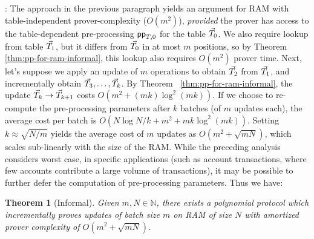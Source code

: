 \documentclass[11pt]{article}
\newtheorem{theorem}{Theorem}[section]
\begin{document}
    : The approach in the previous paragraph yields an argument for RAM with
    table-independent prover-complexity ($O(m^2)$), {\em provided} the prover has access to the table-dependent pre-processing
    $\mathsf{pp}_{T,0}$ for the table $\vec{T}_0$. We also require lookup from table $\vec{T}_1$, but it differs from $\vec{T}_0$ in at most $m$
    positions, so by Theorem \ref{thm:pp-for-ram-informal}, this lookup also requires $O(m^2)$ prover time. Next, let's suppose we apply an
    update of $m$ operations to obtain $\vec{T}_2$ from $\vec{T}_1$, and incrementally obtain $\vec{T}_3,\ldots,\vec{T}_k$. By Theorem ~\ref{thm:pp-for-ram-informal},
    the update $\vec{T}_k\rightarrow \vec{T}_{k+1}$ costs $O(m^2 + (mk)\log^2(mk))$. If we choose to re-compute the pre-processing parameters after $k$
    batches (of $m$ updates each), the average cost per batch is $O(N\log N/k + m^2 + mk\log^2(mk))$. Setting $k\approx \sqrt{N/m}$ yields the
    average cost of $m$ updates as $O(m^2+\sqrt{mN})$, which scales sub-linearly with the size of the RAM. While the preceding analysis considers
    worst case, in specific applications (such as account transactions, where few accounts contribute a large volume of transactions), it may be
    possible to further defer the computation of pre-processing parameters. Thus we have:

    \begin{theorem}[Informal]\label{thm:inc-ver-ram-informal}
    Given $m,N\in \mathbb{N}$, there exists a polynomial protocol which incrementally proves updates of batch size $m$ on RAM of size $N$
    with amortized prover complexity of $O(m^2 + \sqrt{mN})$.
    \end{theorem}
\end{document}
